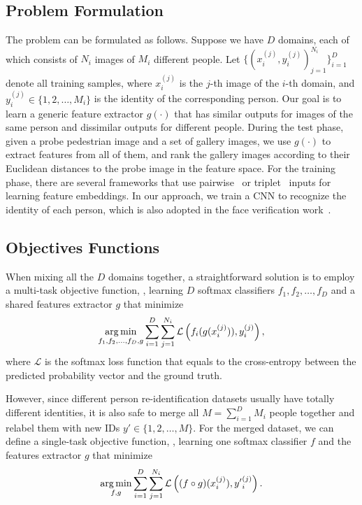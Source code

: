 \subsection{Problem Formulation} %
\label{sub:md-prob-formulation}
The problem can be formulated as follows. Suppose we have $D$ domains, each of which consists of $N_i$ images of $M_i$ different people. Let $\{(x_i^{(j)}, y_i^{(j)})_{j=1}^{N_i}\}_{i=1}^{D}$ denote all training samples, where $x_i^{(j)}$ is the $j$-th image of the $i$-th domain, and $y_i^{(j)} \in \{1,2,\dots,M_i\}$ is the identity of the corresponding person. Our goal is to learn a generic feature extractor $g(\cdot)$ that has similar outputs for images of the same person and dissimilar outputs for different people. During the test phase, given a probe pedestrian image and a set of gallery images, we use $g(\cdot)$ to extract features from all of them, and rank the gallery images according to their Euclidean distances to the probe image in the feature space. For the training phase, there are several frameworks that use pairwise~\cite{li2014deepreid,ahmed2015improved} or triplet~\cite{schroff2015facenet} inputs for learning feature embeddings. In our approach, we train a CNN to recognize the identity of each person, which is also adopted in the face verification work~\cite{sun2014deep1}.

\subsection{Objectives Functions} %
\label{sub:md-jstl-objectives}
When mixing all the $D$ domains together, a straightforward solution is to employ a multi-task objective function, \ie, learning $D$ softmax classifiers $f_1, f_2, \dots, f_D$ and a shared features extractor $g$ that minimize
\begin{equation} \label{eq:md-multi-task-objfunc}
    \mathop{\mathrm{arg\,min}}_{f_1,f_2,\dots,f_D,g} \sum_{i=1}^D \sum_{j=1}^{N_i} \mathcal{L}\left( f_i(g(x_i^{(j)})), y_i^{(j)} \right),
\end{equation}
where $\mathcal{L}$ is the softmax loss function that equals to the cross-entropy between the predicted probability vector and the ground truth.

However, since different person re-identification datasets usually have totally different identities, it is also safe to merge all $M=\sum_{i=1}^D M_i$ people together and relabel them with new IDs ${y'} \in \{1,2,\dots,M\}$. For the merged dataset, we can define a single-task objective function, \ie, learning one softmax classifier $f$ and the features extractor $g$ that minimize
\begin{equation} \label{eq:md-single-task-objfunc}
    \mathop{\mathrm{arg\,min}}_{f,g} \sum_{i=1}^D \sum_{j=1}^{N_i} \mathcal{L}\left( (f\circ g)(x_i^{(j)}), {y'}_i^{(j)} \right).
\end{equation}

